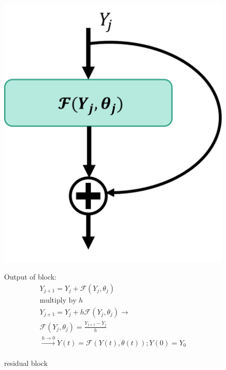 \documentclass{article}
\theoremstyle{remark}
\begin{document}
\begin{figure}[H]
    \centering
    \begin{minipage}{0.45\textwidth}
        \centering
        \includegraphics[scale=0.5]{imgs/residual_block.png} %
        \caption{residual block}
    \end{minipage}\hfill
    \begin{minipage}{0.45\textwidth}
        \centering
        Output of block:
        \begin{gather*}
            Y_{j+1} = Y_j + \mathcal{F}(Y_j, \theta_j) \\
            \text{multiply by $h$} \\
            Y_{j+1} = Y_j + h\mathcal{F}(Y_j, \theta_j) \rightarrow \\
            \mathcal{F}(Y_j, \theta_j) = \frac{Y_{j+1} - Y_j}{h} \\
            \xrightarrow[]{h \rightarrow 0} \dot{Y}(t) = \mathcal{F}(Y(t), \theta(t)); Y(0) = Y_0
        \end{gather*}
    \end{minipage}
\end{figure}
\end{document}
